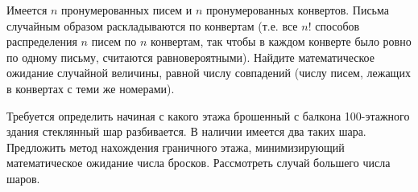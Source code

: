 \begin{problem}
Имеется $n$ пронумерованных писем и $n$ пронумерованных конвертов. Письма случайным образом раскладываются по конвертам (т.е. все $n!$ 
способов распределения $n$ писем по $n$ конвертам, так чтобы в каждом конверте было ровно по одному письму, считаются равновероятными). 
Найдите математическое ожидание случайной величины, равной числу совпадений (числу писем, лежащих в конвертах с теми же номерами). 
\end{problem}

\begin{problem}

Требуется определить начиная с какого этажа брошенный с балкона 100-этажного здания стеклянный шар разбивается. В наличии имеется два таких шара. Предложить метод нахождения граничного этажа, минимизирующий математическое ожидание числа бросков. Рассмотреть случай большего числа шаров.  

\end{problem}